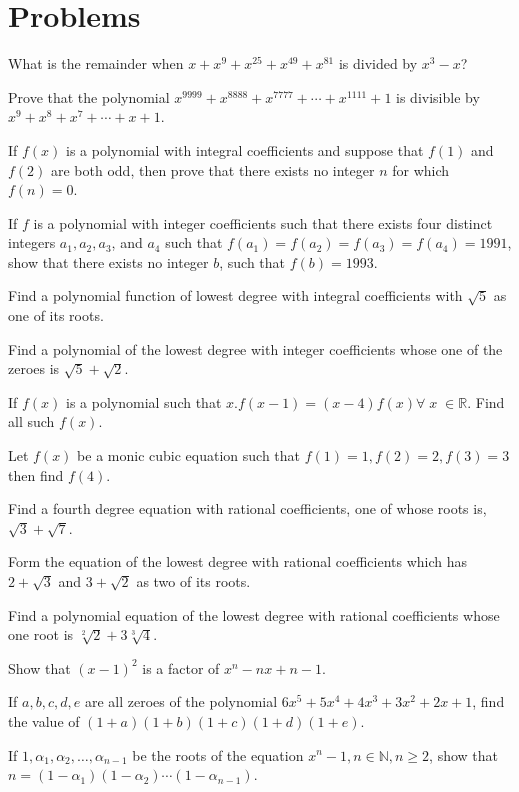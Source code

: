 \section{Problems}
\startitemize[n, 1*broad]
\item What is the remainder when $x + x^9 + x^{25} + x^{49} + x^{81}$ is divided by $x^3 - x$?
\item Prove that the polynomial $x^{9999} + x^{8888} + x^{7777} + \cdots + x^{1111} + 1$ is divisible by
  $x^9 + x^8 + x^7 + \cdots + x + 1$.
\item If $f(x)$ is a polynomial with integral coefficients and suppose that $f(1)$ and $f(2)$ are both odd,
  then prove that there exists no integer $n$ for which $f(n) = 0$.
\item If $f$ is a polynomial with integer coefficients such that there exists four distinct integers $a_1,
  a_2, a_3$, and $a_4$ such that $f(a_1) = f(a_2) = f(a_3) = f(a_4) = 1991$, show that there exists no
  integer $b$, such that $f(b) = 1993$.
\item Find a polynomial function of lowest degree with integral coefficients with $\sqrt{5}$ as one of its
  roots.
\item Find a polynomial of the lowest degree with integer coefficients whose one of the zeroes is $\sqrt{5}
  + \sqrt{2}$.
\item If $f(x)$ is a polynomial such that $x.f(x - 1) = (x - 4)f(x)\forall\;x\;\in\mathbb{R}$. Find all
  such $f(x)$.
\item Let $f(x)$ be a monic cubic equation such that $f(1) = 1, f(2) = 2, f(3) = 3$ then find $f(4)$.
\item Find a fourth degree equation with rational coefficients, one of whose roots is, $\sqrt{3} +
  \sqrt{7}$.
\item Form the equation of the lowest degree with rational coefficients which has $2 + \sqrt{3}$ and $3 +
  \sqrt{2}$ as two of its roots.
\item Find a polynomial equation of the lowest degree with rational coefficients whose one root is
  $\sqrt[2]{2} + 3\sqrt[3]{4}$.
\item Show that $(x - 1)^2$ is a factor of $x^n - nx + n - 1$.
\item If $a, b, c, d, e$ are all zeroes of the polynomial $6x^5 + 5x^4 + 4x^3 + 3x^2 + 2x + 1$, find the
  value of $(1 + a)(1 + b)(1 + c)(1 + d)(1 + e)$.
\item If $1, \alpha_1, \alpha_2, \ldots, \alpha_{n - 1}$ be the roots of the equation $x^n - 1,
  n\in\mathbb{N}, n\geq 2$, show that $n = (1 - \alpha_1)(1 - \alpha_2)\cdots(1 - \alpha_{n - 1})$.
